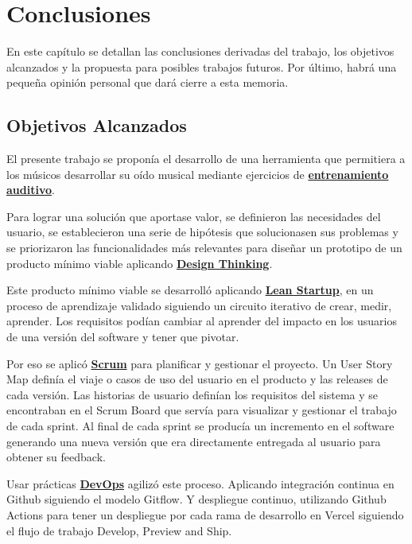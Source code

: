 \documentclass[12pt,twoside,titlepage]{report}
\begin{document}
\newpage

\chapter{Conclusiones}
\label{sec:conclusiones}

En este capítulo se detallan las conclusiones derivadas del trabajo, los objetivos alcanzados y la propuesta para posibles trabajos futuros. Por último, habrá una pequeña opinión personal que dará cierre a esta memoria.
\section{Objetivos Alcanzados}

El presente trabajo se proponía el desarrollo de una herramienta que permitiera a los músicos desarrollar su oído musical mediante ejercicios de \hyperref[sec:eartraining]{\textbf{entrenamiento auditivo}}.

Para lograr una solución que aportase valor, se definieron las necesidades del usuario, se establecieron una serie de hipótesis que solucionasen sus problemas y se priorizaron las funcionalidades más relevantes para diseñar un prototipo de un producto mínimo viable aplicando \hyperref[sec:design]{\textbf{Design Thinking}}.

Este producto mínimo viable se desarrolló aplicando \hyperref[sec:lean]{\textbf{Lean Startup}}, en un proceso de aprendizaje validado siguiendo un circuito iterativo de crear, medir, aprender. Los requisitos podían cambiar al aprender del impacto en los usuarios de una versión del software y tener que pivotar.

Por eso se aplicó \hyperref[sec:Scrum]{\textbf{Scrum}} para planificar y gestionar el proyecto. Un User Story Map definía el viaje o casos de uso del usuario en el producto y las releases de cada versión. Las historias de usuario definían los requisitos del sistema y se encontraban en el Scrum Board que servía para visualizar y gestionar el trabajo de cada sprint. Al final de cada sprint se producía un incremento en el software generando una nueva versión que era directamente entregada al usuario para obtener su feedback.

Usar prácticas \hyperref[sec:DevOps]{\textbf{DevOps}} agilizó este proceso. Aplicando integración continua en Github siguiendo el modelo Gitflow. Y despliegue continuo, utilizando Github Actions para tener un despliegue por cada rama de desarrollo en Vercel siguiendo el flujo de trabajo Develop, Preview and Ship.
\end{document}
